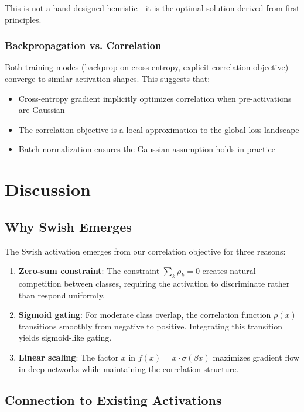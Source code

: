 \documentclass{article}
\begin{document}
This is not a hand-designed heuristic---it is the optimal solution derived from first principles.

\subsubsection{Backpropagation vs. Correlation}

Both training modes (backprop on cross-entropy, explicit correlation objective) converge to similar activation shapes. This suggests that:
\begin{itemize}
\item Cross-entropy gradient implicitly optimizes correlation when pre-activations are Gaussian
\item The correlation objective is a local approximation to the global loss landscape
\item Batch normalization ensures the Gaussian assumption holds in practice
\end{itemize}

\section{Discussion}
\label{sec:discussion}

\subsection{Why Swish Emerges}

The Swish activation emerges from our correlation objective for three reasons:

\begin{enumerate}
\item \textbf{Zero-sum constraint}: The constraint $\sum_k \rho_k = 0$ creates natural competition between classes, requiring the activation to discriminate rather than respond uniformly.

\item \textbf{Sigmoid gating}: For moderate class overlap, the correlation function $\rho(x)$ transitions smoothly from negative to positive. Integrating this transition yields sigmoid-like gating.

\item \textbf{Linear scaling}: The factor $x$ in $f(x) = x \cdot \sigma(\beta x)$ maximizes gradient flow in deep networks while maintaining the correlation structure.
\end{enumerate}

\subsection{Connection to Existing Activations}
\end{document}

